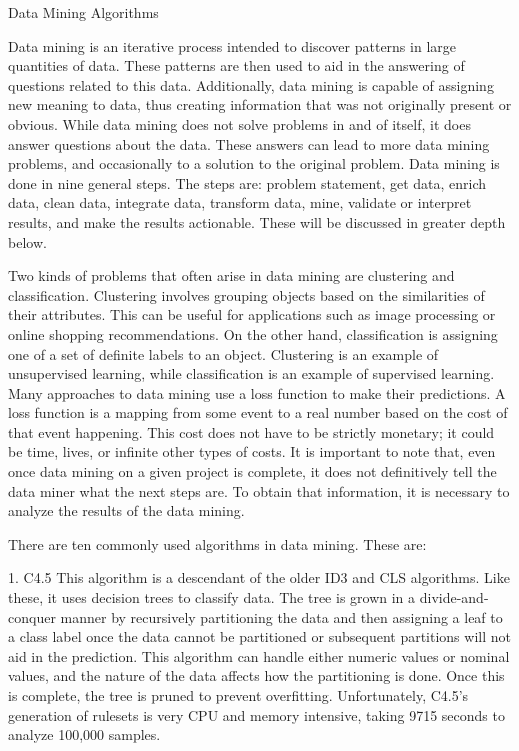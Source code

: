 Data Mining Algorithms

Data mining is an iterative process intended to discover patterns
in large quantities of data. These patterns are then used to aid 
in the answering of questions related to this data. Additionally,
data mining is capable of assigning new meaning to data, thus 
creating information that was not originally present or obvious. 
While data mining does not solve problems in and of itself, it 
does answer questions about the data. These answers can lead to 
more data mining problems, and occasionally to a solution to the 
original problem. Data mining is done in nine general steps. The 
steps are: problem statement, get data, enrich data, clean data, 
integrate data, transform data, mine, validate or interpret 
results, and make the results actionable. These will be discussed 
in greater depth below.

Two kinds of problems that often arise in data mining are clustering
and classification. Clustering involves grouping objects
based on the similarities of their attributes. This can be useful
for applications such as image processing or online shopping
recommendations. On the other hand, classification is assigning
one of a set of definite labels to an object. Clustering is
an example of unsupervised learning, while classification is
an example of supervised learning. Many approaches to data
mining use a loss function to make their predictions. A loss
function is a mapping from some event to a real number based
on the cost of that event happening. This cost does not have
to be strictly monetary; it could be time, lives, or infinite other
types of costs. It is important to note that, even once data
mining on a given project is complete, it does not definitively
tell the data miner what the next steps are. To obtain that
information, it is necessary to analyze the results of the data
mining.

There are ten commonly used algorithms in data mining.
These are:

1. C4.5  This algorithm is a descendant of the older ID3 and CLS algorithms.
Like these, it uses decision trees to classify data. The
tree is grown in a divide-and-conquer manner by recursively
partitioning the data and then assigning a leaf to a class label
once the data cannot be partitioned or subsequent partitions
will not aid in the prediction. This algorithm can handle either
numeric values or nominal values, and the nature of the data
affects how the partitioning is done. Once this is complete,
the tree is pruned to prevent overfitting. Unfortunately, C4.5’s
generation of rulesets is very CPU and memory intensive,
taking 9715 seconds to analyze 100,000 samples.


